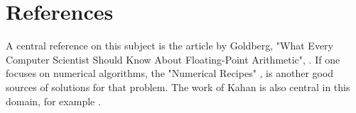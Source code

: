 %

\section{References}

A central reference on this subject is the article 
by Goldberg, "What Every Computer Scientist Should Know About Floating-Point Arithmetic", 
\cite{WhatEveryComputerScientist}.
If one focuses on numerical algorithms, the "Numerical Recipes" \cite{NumericalRecipes},
is another good sources of solutions for that problem.
The work of Kahan is also central in this domain, for example \cite{Kahan2004}.


